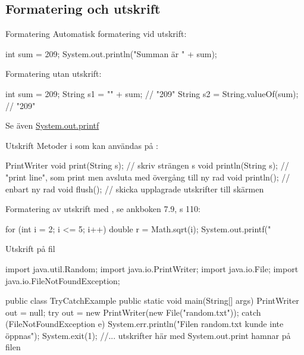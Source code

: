 \documentclass{lecturenotes}
\begin{document}
\subsection{Formatering och utskrift}
\begin{Slide}{Formatering}
Automatisk formatering vid utskrift:
\begin{Code}
int sum = 209;
System.out.println("Summan är " + sum);
\end{Code}
Formatering utan utskrift:
\begin{Code}
int sum = 209;
String s1 = "" + sum;            // "209"
String s2 = String.valueOf(sum); // "209"
\end{Code}
Se även \href{http://stackoverflow.com/questions/18730978/how-do-i-use-system-out-printf}{System.out.printf}
\end{Slide} 

\begin{Slide}{Utskrift}
Metoder i \href{http://docs.oracle.com/javase/8/docs/api/java/io/PrintWriter.html}{} som kan användas på :
\begin{ClassSpec}{PrintWriter}
void print(String s);   // skriv strängen s
void println(String s); // "print line", som print men avsluta med övergång till ny rad
void println();         // enbart ny rad
void flush();           // skicka upplagrade utskrifter till skärmen
\end{ClassSpec}

Formatering av utskrift med , se ankboken 7.9, s 110:
\begin{Code}
for (int i = 2; i <= 5; i++) {
    double r = Math.sqrt(i);
    System.out.printf("%
}
\end{Code}
\end{Slide} 

\begin{Slide}{Utskrift på fil}

\begin{Code}
import java.util.Random;
import java.io.PrintWriter;
import java.io.File;
import java.io.FileNotFoundException;

public class TryCatchExample {
    public static void main(String[] args) {
        PrintWriter out = null;
        try {
            out = new PrintWriter(new File("random.txt"));
        } catch (FileNotFoundException e) {
            System.err.println("Filen random.txt kunde inte öppnas");
            System.exit(1);
        }
        //... utskrifter här med System.out.print hamnar på filen
    }
}
\end{Code}
\end{Slide} 
\end{document}
